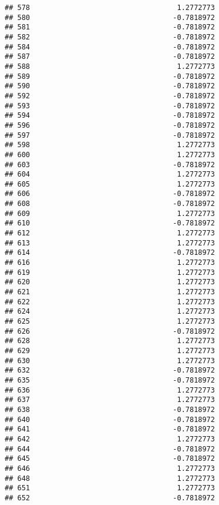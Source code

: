 \documentclass[
]{article}
\begin{document}
\begin{verbatim}
## 578                                   1.2772773
## 580                                  -0.7818972
## 581                                  -0.7818972
## 582                                  -0.7818972
## 584                                  -0.7818972
## 587                                  -0.7818972
## 588                                   1.2772773
## 589                                  -0.7818972
## 590                                  -0.7818972
## 592                                  -0.7818972
## 593                                  -0.7818972
## 594                                  -0.7818972
## 596                                  -0.7818972
## 597                                  -0.7818972
## 598                                   1.2772773
## 600                                   1.2772773
## 603                                  -0.7818972
## 604                                   1.2772773
## 605                                   1.2772773
## 606                                  -0.7818972
## 608                                  -0.7818972
## 609                                   1.2772773
## 610                                  -0.7818972
## 612                                   1.2772773
## 613                                   1.2772773
## 614                                  -0.7818972
## 616                                   1.2772773
## 619                                   1.2772773
## 620                                   1.2772773
## 621                                   1.2772773
## 622                                   1.2772773
## 624                                   1.2772773
## 625                                   1.2772773
## 626                                  -0.7818972
## 628                                   1.2772773
## 629                                   1.2772773
## 630                                   1.2772773
## 632                                  -0.7818972
## 635                                  -0.7818972
## 636                                   1.2772773
## 637                                   1.2772773
## 638                                  -0.7818972
## 640                                  -0.7818972
## 641                                  -0.7818972
## 642                                   1.2772773
## 644                                  -0.7818972
## 645                                  -0.7818972
## 646                                   1.2772773
## 648                                   1.2772773
## 651                                   1.2772773
## 652                                  -0.7818972

\end{verbatim}
\end{document}
